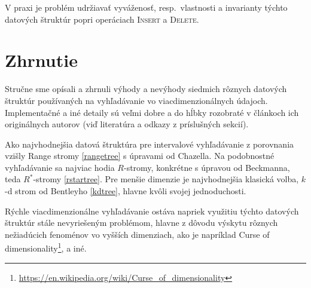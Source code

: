 \documentclass[10pt,a4paper,oneside]{article}
\begin{document}
{V praxi je problém udržiavať vyváženosť, resp.~vlastnosti a invarianty týchto datových štruktúr popri operáciach \textsc{Insert} a \textsc{Delete}.

\section{Zhrnutie}

Stručne sme opísali a zhrnuli výhody a nevýhody siedmich rôznych datových štruktúr používaných na vyhľadávanie vo viacdimenzionálnych údajoch. Implementačné a iné detaily sú veľmi dobre a do hĺbky rozobraté v článkoch ich originálnych autorov (viď literatúra a odkazy z príslušných sekcií).

Ako najvhodnejšia datová štruktúra pre intervalové vyhľadávanie z porovnania vzišly Range stromy \ref{rangetree} s úpravami od Chazella. Na podobnostné vyhľadávanie sa najviac hodia $R$-stromy, konkrétne s úpravou od Beckmanna, teda $R^*$-stromy \ref{rstartree}. Pre menšie dimenzie je najvhodnejšia klasická volba, $k$-d strom od Bentleyho \ref{kdtree}, hlavne kvôli svojej jednoduchosti.

Rýchle viacdimenzionálne vyhľadávanie ostáva napriek využitiu týchto datových štruktúr stále
nevyriešeným problémom, hlavne z dôvodu výskytu rôznych nežiadúcich fenoménov vo vyšších dimenziach, ako je napríklad Curse of dimensionality\footnote{\url{https://en.wikipedia.org/wiki/Curse_of_dimensionality}}, a iné.
}

{
\footnotesize %

}
\end{document}
